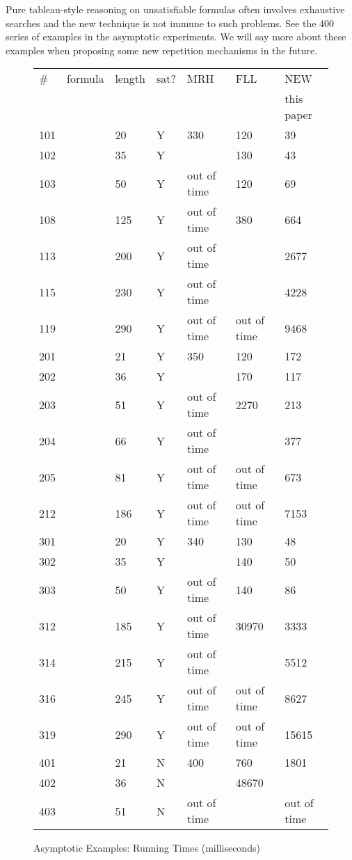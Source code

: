 \documentclass[submission,copyright,creativecommons]{eptcs}
\begin{document}
Pure tableau-style reasoning on unsatisfiable formulas
often involves
exhaustive searches and
the new technique is not immune to
such problems.
See the 400 series of examples in the asymptotic
experiments.
We will say more about these examples
when proposing some new 
repetition mechanisms
in the future.

\begin{figure}
{\small
\begin{tabular}{lllllll}
\hline
\# & formula  & length &  sat? & MRH & FLL & NEW\\
 &   &  &   & \cite{Rey:startab} & \cite{FLL10} & this paper\\
\hline
\hline
101 &  & 20  & Y & 330 & 120 & 39 \\
\hline
102 &  & 35  & Y &  & 130 &  43\\
\hline
103 &  & 50  & Y & out of time & 120 & 69 \\
\hline
108 &  & 125  & Y & out of time & 380 & 664 \\
\hline
113 &  & 200  & Y & out of time &  & 2677 \\
\hline
115 &  & 230  & Y & out of time &  & 4228 \\
\hline
119 &  & 290  & Y & out of time & out of time  & 9468\\                             
\hline
\hline
201 &  & 21  & Y & 350 & 120 & 172 \\
\hline
202 &  & 36  & Y &  & 170 &  117\\
\hline
203 &  & 51  & Y & out of time & 2270 & 213 \\
\hline
204 &  & 66  & Y & out of time &  & 377\\
\hline
205 &  & 81  & Y & out of time & out of time & 673 \\
\hline
212 &  & 186  & Y & out of time &out of time & 7153 \\                   
\hline
\hline
301 &  & 20  & Y & 340 & 130 & 48 \\
\hline
302 &  & 35  & Y &  & 140 &  50\\
\hline
303 &  & 50  & Y & out of time & 140 & 86 \\
\hline
312&  & 185  & Y & out of time & 30970 & 3333\\
\hline
314 &  & 215  & Y & out of time &  & 5512\\           
\hline
316 &  & 245  & Y & out of time & out of time & 8627 \\   
\hline
319 &  & 290  & Y & out of time & out of time &  15615 \\           
\hline
\hline
401 &  & 21  & N & 400 & 760 & 1801 \\
\hline
402 &  & 36  & N &  & 48670 &  \\
\hline
403 &  & 51  & N & out of time &  & out of time \\
\hline
\end{tabular}
}\caption{Asymptotic Examples: Running Times (milliseconds)}
\label{fig:fllcomp}
\end{figure}
\end{document}
